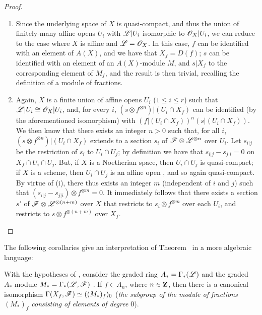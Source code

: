 \begin{proof}
\label{proof-1.9.3.1}
\medskip\noindent
\begin{enumerate}[label=(\roman*)]
  \item Since the underlying space of $X$ is quasi-compact, and thus the union of
    finitely-many affine opens $U_i$ with $\mathscr{L}|U_i$ isomorphic to
    $\mathscr{O}_X|U_i$, we can reduce to the case where $X$ is affine and $\mathscr{L}=\mathscr{O}_X$.
    In this case, $f$ can be identified with an element of $A(X)$, and we have that
    $X_f=D(f)$; $s$ can be identified with an element of an $A(X)$-module $M$, and
    $s|X_f$ to the corresponding element of $M_f$, and the result is then trivial,
    recalling the definition of a module of fractions.
  \item Again, $X$ is a finite union of affine opens $U_i$ ($1\leq i\leq r$)
    such that $\mathscr{L}|U_i\cong\mathscr{O}_X|U_i$, and, for every $i$,
    $(s\otimes f^{\otimes n})|(U_i\cap X_f)$ can be identified (by the aforementioned
    isomorphism) with $(f|(U_i\cap X_f))^n(s|(U_i\cap X_f))$. We then know
     that there exists an integer $n>0$ such that, for all
    $i$, $(s\otimes f^{\otimes n})|(U_i\cap X_f)$ extends to a section $s_i$ of
    $\mathscr{F}\otimes\mathscr{L}^{\otimes n}$ over $U_i$. Let $s_{i|j}$ be the restriction
    of $s_i$ to $U_i\cap U_j$; by definition we have that $s_{i|j}-s_{j|i}=0$ on
    $X_f\cap U_i\cap U_j$. But, if $X$ is a Noetherian space, then $U_i\cap U_j$ is
    quasi-compact; if $X$ is a scheme, then $U_i\cap U_j$ is an affine open
    , and so again quasi-compact. By virtue of (i), there thus
    exists an integer $m$ (independent of $i$ and $j$) such that
    $(s_{i|j}-s_{j|i})\otimes f^{\otimes m}=0$. It immediately follows that there
    exists a section $s'$ of $\mathscr{F}\otimes\mathscr{L}^{\otimes(n+m)}$ over $X$ that
    restricts to $s_i\otimes f^{\otimes m}$ over each $U_i$, and restricts to
    $s\otimes f^{\otimes(n+m)}$ over $X_f$.
\end{enumerate}
\end{proof}

The following corollaries give an interpretation of Theorem~ in a more
algebraic language:
\begin{corollary}[9.3.2]
\label{1.9.3.2}
With the hypotheses of , consider the graded ring $A_*=\Gamma_*(\mathscr{L})$
and the graded $A_*$-module $M_*=\Gamma_*(\mathscr{L},\mathscr{F})$ . If $f\in A_n$,
where $n\in\mathbf{Z}$, then there is a canonical isomorphism
$\Gamma(X_f,\mathscr{F})\simeq((M_*)_f)_0$ (\emph{the subgroup of the module of
fractions $(M_*)_f$ consisting of elements of degree $0$}).
\end{corollary}

